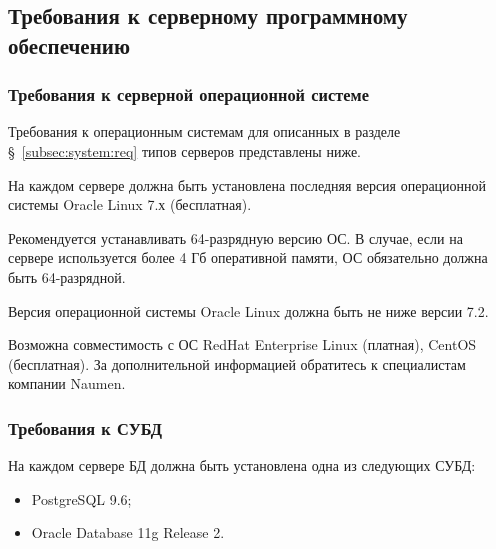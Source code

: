 %
%
%
%
%
%
%
%

\subsection{Требования к серверному программному обеспечению}

\subsubsection{Требования к серверной операционной системе}

Требования к операционным системам для описанных в разделе \S~\ref{subsec:system:req} типов серверов представлены ниже.

На каждом сервере должна быть установлена последняя версия операционной системы Oracle Linux 7.х (бесплатная).

Рекомендуется устанавливать 64-разрядную версию ОС.
В случае, если на сервере используется более 4 Гб оперативной памяти, ОС обязательно должна быть 64-разрядной.

Версия операционной системы Oracle Linux должна быть не ниже версии 7.2.

Возможна совместимость с ОС RedHat Enterprise Linux (платная), CentOS (бесплатная).
За дополнительной информацией обратитесь к специалистам компании Naumen.

\subsubsection{Требования к СУБД}

На каждом сервере БД должна быть установлена одна из следующих СУБД:
\begin{itemize}
    \item PostgreSQL 9.6;
    \item Oracle Database 11g Release 2. %
\end{itemize}

